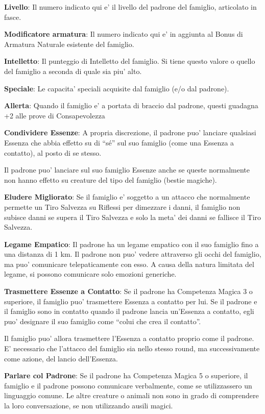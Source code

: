 \documentclass[a4paper,11pt,twoside,openany]{dndbook}
\begin{document}
\textbf{Livello}: Il numero indicato qui e' il livello del padrone del famiglio, articolato in fasce.

\textbf{Modificatore armatura}: Il numero indicato qui e' in aggiunta al Bonus di Armatura Naturale esistente del famiglio.

\textbf{Intelletto}: Il punteggio di Intelletto del famiglio. Si tiene questo valore o quello del famiglio a seconda di quale sia piu' alto. 

\textbf{Speciale}: Le capacita' speciali acquisite dal famiglio (e/o dal padrone).

\textbf{Allerta}: Quando il famiglio e' a portata di braccio dal padrone, questi guadagna +2 alle prove di Consapevolezza

\textbf{Condividere Essenze}: A propria discrezione, il padrone puo' lanciare qualsiasi Essenza che abbia effetto su di ``sé'' sul suo famiglio (come una Essenza a contatto), al posto di se stesso.

Il padrone puo' lanciare sul suo famiglio Essenze anche se queste normalmente non hanno effetto su creature del tipo del famiglio (bestie magiche).

\textbf{Eludere Migliorato}: Se il famiglio e' soggetto a un attacco che normalmente permette un Tiro Salvezza su Riflessi per dimezzare i danni, il famiglio non subisce danni se supera il Tiro Salvezza e solo la meta' dei danni se fallisce il Tiro Salvezza.

\textbf{Legame Empatico}: Il padrone ha un legame empatico con il suo famiglio fino a una distanza di 1 km. Il padrone non puo' vedere attraverso gli occhi del famiglio, ma puo' comunicare telepaticamente con esso. A causa della natura limitata del legame, si possono comunicare solo emozioni generiche.

\textbf{Trasmettere Essenze a Contatto}: Se il padrone ha Competenza Magica 3 o superiore, il famiglio puo' trasmettere Essenza a contatto per lui. Se il padrone e il famiglio sono in contatto quando il padrone lancia un'Essenza a contatto, egli puo' designare il suo famiglio come ``colui che crea il contatto''.

Il famiglio puo' allora trasmettere l'Essenza a contatto proprio come il padrone. E' necessario che l'attacco del famiglio sia nello stesso round, ma successivamente come azione, del lancio dell'Essenza.

\textbf{Parlare col Padrone}: Se il padrone ha Competenza Magica 5 o superiore, il famiglio e il padrone possono comunicare verbalmente, come se utilizzassero un linguaggio comune. Le altre creature o animali non sono in grado di comprendere la loro conversazione, se non utilizzando ausili magici.
\end{document}
